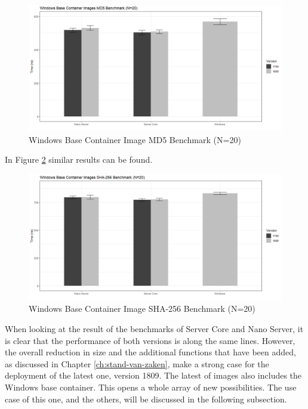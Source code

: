 \begin{figure}[h]
	\captionsetup{width=0.8\linewidth}
	\includegraphics[width=0.9\linewidth]{img/Methodologie/Containers1.png}
	\centering
	\caption{Windows Base Container Image MD5 Benchmark (N=20)}
	\label{fig:MD5}
\end{figure}

In Figure \ref{fig:SHA} similar results can be found. 

\begin{figure}[h]
	\captionsetup{width=0.8\linewidth}
	\includegraphics[width=0.9\linewidth]{img/Methodologie/Containers2.png}
	\centering
	\caption{Windows Base Container Image SHA-256 Benchmark (N=20)}
	\label{fig:SHA}
\end{figure}

 When looking at the result of the benchmarks of Server Core and Nano Server, it is clear that the performance of both versions is along the same lines. However, the overall reduction in size and the additional functions that have been added, as discussed in Chapter \ref{ch:stand-van-zaken}, make a strong case for the deployment of the latest one, version 1809. The latest of images also includes the Windows base container. This opens a whole array of new possibilities. The use case of this one, and the others, will be discussed in the following subsection.

